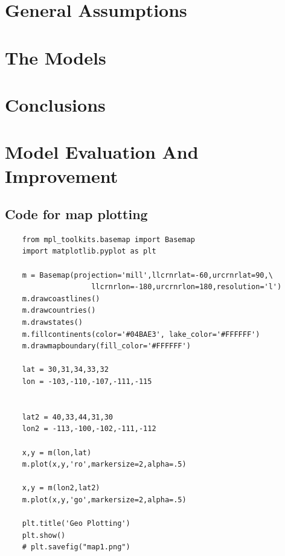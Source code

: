 \documentclass{mcmthesis}
\begin{document}
\section{General Assumptions}
  

\section{The Models}
  

\section{Conclusions}
  

\section{Model Evaluation And Improvement}
  


\newpage






\newpage
\begin{appendices}
  
	\section{Code for map plotting}
  
  \begin{verbatim}
    from mpl_toolkits.basemap import Basemap
    import matplotlib.pyplot as plt

    m = Basemap(projection='mill',llcrnrlat=-60,urcrnrlat=90,\
                    llcrnrlon=-180,urcrnrlon=180,resolution='l')
    m.drawcoastlines()
    m.drawcountries()
    m.drawstates()
    m.fillcontinents(color='#04BAE3', lake_color='#FFFFFF')
    m.drawmapboundary(fill_color='#FFFFFF')

    lat = 30,31,34,33,32
    lon = -103,-110,-107,-111,-115


    lat2 = 40,33,44,31,30
    lon2 = -113,-100,-102,-111,-112

    x,y = m(lon,lat)
    m.plot(x,y,'ro',markersize=2,alpha=.5)

    x,y = m(lon2,lat2)
    m.plot(x,y,'go',markersize=2,alpha=.5)

    plt.title('Geo Plotting')
    plt.show()
    # plt.savefig("map1.png")
  \end{verbatim}

\end{appendices}
\end{document}
